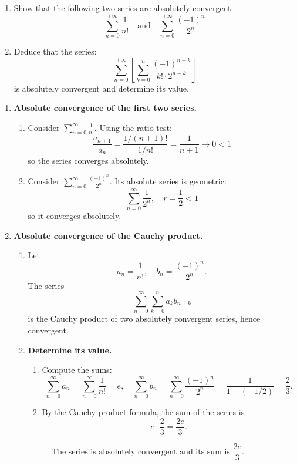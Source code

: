 \documentclass[12pt]{article}
\begin{document}
\section{}
\begin{enumerate}
    \item Show that the following two series are absolutely convergent:
    \[
    \sum_{n=0}^{+\infty} \frac{1}{n!} \quad \text{and} \quad \sum_{n=0}^{+\infty} \frac{(-1)^n}{2^n}
    \]
    
    \item Deduce that the series:
    \[
    \sum_{n=0}^{+\infty} \left[ \sum_{k=0}^{n} \frac{(-1)^{n-k}}{k! \cdot 2^{n-k}} \right]
    \]
    is absolutely convergent and determine its value.
\end{enumerate}

\begin{correctionbox}
\begin{enumerate}
    \item \textbf{Absolute convergence of the first two series.}
    \begin{enumerate}
        \item Consider $\sum_{n=0}^{\infty} \frac{1}{n!}$. Using the ratio test:
        \[
        \frac{a_{n+1}}{a_n} = \frac{1/(n+1)!}{1/n!} = \frac{1}{n+1} \to 0 < 1
        \]
        so the series converges absolutely.
        \item Consider $\sum_{n=0}^{\infty} \frac{(-1)^n}{2^n}$. Its absolute series is geometric:
        \[
        \sum_{n=0}^{\infty} \frac{1}{2^n}, \quad r = \frac{1}{2} < 1
        \]
        so it converges absolutely.
    \end{enumerate}

    \item \textbf{Absolute convergence of the Cauchy product.}
    \begin{enumerate}
        \item Let 
        \[
        a_n = \frac{1}{n!}, \quad b_n = \frac{(-1)^n}{2^n}.
        \]
        The series 
        \[
        \sum_{n=0}^{\infty} \sum_{k=0}^{n} a_k b_{n-k}
        \]
        is the Cauchy product of two absolutely convergent series, hence convergent.

    \item \textbf{Determine its value.}
    \begin{enumerate}
        \item Compute the sums:
        \[
        \sum_{n=0}^{\infty} a_n = \sum_{n=0}^{\infty} \frac{1}{n!} = e, \quad 
        \sum_{n=0}^{\infty} b_n = \sum_{n=0}^{\infty} \frac{(-1)^n}{2^n} = \frac{1}{1 - (-1/2)} = \frac{2}{3}.
        \]
        \item By the Cauchy product formula, the sum of the series is
        \[
        e \cdot \frac{2}{3} = \frac{2e}{3}.
        \]
    \end{enumerate}
    \end{enumerate}
\end{enumerate}

\[
\boxed{\text{The series is absolutely convergent and its sum is } \frac{2e}{3}.}
\]
\end{correctionbox}
\end{document}
